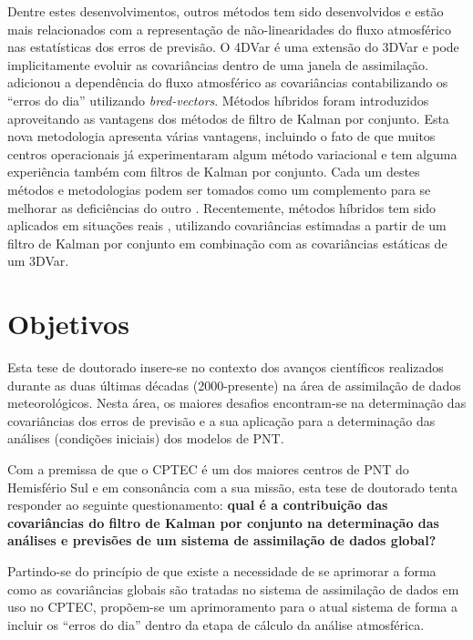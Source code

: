 Dentre estes desenvolvimentos, outros métodos tem sido desenvolvidos e estão mais relacionados com a representação de não-linearidades do fluxo atmosférico nas estatísticas dos erros de previsão. O 4DVar \cite{thepautandcourtier/1991} é uma extensão do 3DVar \cite{lorenc/1986} e pode implicitamente evoluir as covariâncias dentro de uma janela de assimilação.  adicionou a dependência do fluxo atmosférico as covariâncias contabilizando os ``erros do dia'' utilizando \textit{bred-vectors}. Métodos híbridos \cite{hamillesnyder/2000} foram introduzidos aproveitando as vantagens dos métodos de filtro de Kalman por conjunto. Esta nova metodologia apresenta várias vantagens, incluindo o fato de que muitos centros operacionais já experimentaram algum método variacional e tem alguma experiência também com filtros de Kalman por conjunto. Cada um destes métodos e metodologias podem ser tomados como um complemento para se melhorar as deficiências do outro \cite{wangetal/2007,wangetal/2009}. Recentemente, métodos híbridos tem sido aplicados em situações reais \cite{wangetal/2013,claytonetal/2012}, utilizando covariâncias estimadas a partir de um filtro de Kalman por conjunto em combinação com as covariâncias estáticas de um 3DVar.

\section{Objetivos}
\label{cap:objetivos}

Esta tese de doutorado insere-se no contexto dos avanços científicos realizados durante as duas últimas décadas (2000-presente) na área de assimilação de dados meteorológicos. Nesta área, os maiores desafios encontram-se na determinação das covariâncias dos erros de previsão e a sua aplicação para a determinação das análises (condições iniciais) dos modelos de PNT. 

Com a premissa de que o CPTEC é um dos maiores centros de PNT do Hemisfério Sul e em consonância com a sua missão, esta tese de doutorado tenta responder ao seguinte questionamento: \textbf{qual é a contribuição das covariâncias do filtro de Kalman por conjunto na determinação das análises e previsões de um sistema de assimilação de dados global?}

Partindo-se do princípio de que existe a necessidade de se aprimorar a forma como as covariâncias globais são tratadas no sistema de assimilação de dados em uso no CPTEC, propõem-se um aprimoramento para o atual sistema de forma a incluir os ``erros do dia'' dentro da etapa de cálculo da análise atmosférica.

